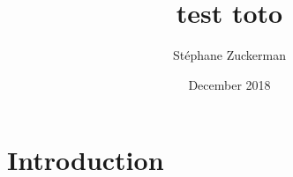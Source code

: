 \documentclass{article}
\title{test toto}
\author{St\'ephane Zuckerman}
\date{December 2018}
\begin{document}
\maketitle

\section{Introduction}
\end{document}
